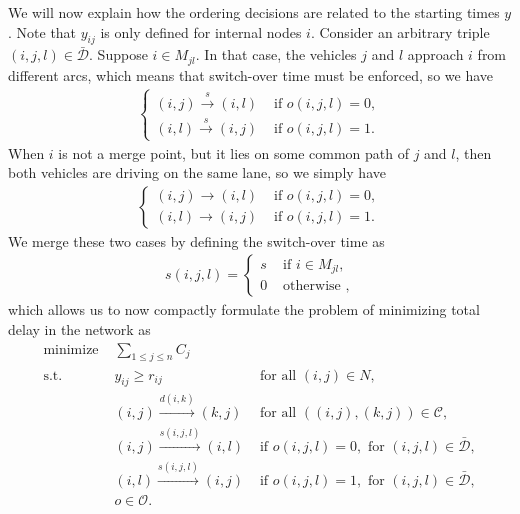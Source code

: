 \documentclass{article}
\theoremstyle{definition}
\theoremstyle{plain}
\begin{document}
We will now explain how the ordering decisions are related to the starting times $y$.
Note that $y_{ij}$ is only defined for internal nodes $i$.
Consider an arbitrary triple $(i,j,l) \in \bar{\mathcal{D}}$. Suppose
$i \in M_{jl}$. In that case, the vehicles $j$ and $l$ approach $i$ from
different arcs, which means that switch-over time must be enforced, so we have
\begin{align}
  \begin{cases}
    (i,j) \xrightarrow{s} (i,l) & \text{ if } o(i,j,l) = 0 , \\
    (i,l) \xrightarrow{s} (i,j) & \text{ if } o(i,j,l) = 1 .
  \end{cases}
\end{align}
When $i$ is not a merge point, but it lies on some common path of $j$ and $l$,
then both vehicles are driving on the same lane, so we simply have
\begin{align}
  \begin{cases}
    (i,j) \xrightarrow{} (i,l) & \text{ if } o(i,j,l) = 0 , \\
    (i,l) \xrightarrow{} (i,j) & \text{ if } o(i,j,l) = 1 .
  \end{cases}
\end{align}
We merge these two cases by defining the switch-over time as
\begin{align}
  s(i,j,l) =
  \begin{cases}
    s & \text{ if } i \in M_{jl}, \\
    0 & \text{ otherwise },
  \end{cases}
\end{align}
%
which allows us to now compactly formulate the problem of minimizing total delay
in the network as
%
\begin{subequations}
\begin{align}
  \text{minimize } & \sum_{1 \leq j \leq n} C_{j} \\
  \text{s.t. } & y_{ij} \geq r_{ij} & \text{ for all } (i,j) \in N, \\
  & (i,j) \xrightarrow{d(i,k)} (k,j) & \text{ for all } ((i,j), (k,j)) \in \mathcal{C} , \label{eq:travel-constraints} \\
  & (i,j) \xrightarrow{s(i,j,l)} (i,l) & \text{ if } o(i,j,l) = 0 , \text{ for } (i,j,l) \in \bar{\mathcal{D}}, \label{eq:common-path-constraints-1} \\
  & (i,l) \xrightarrow{s(i,j,l)} (i,j) & \text{ if } o(i,j,l) = 1 , \text{ for } (i,j,l) \in \bar{\mathcal{D}}, \label{eq:common-path-constraints-2} \\
  & o \in \mathcal{O}. \label{eq:common-path-order-constraints}
\end{align}
\end{subequations}
\end{document}
